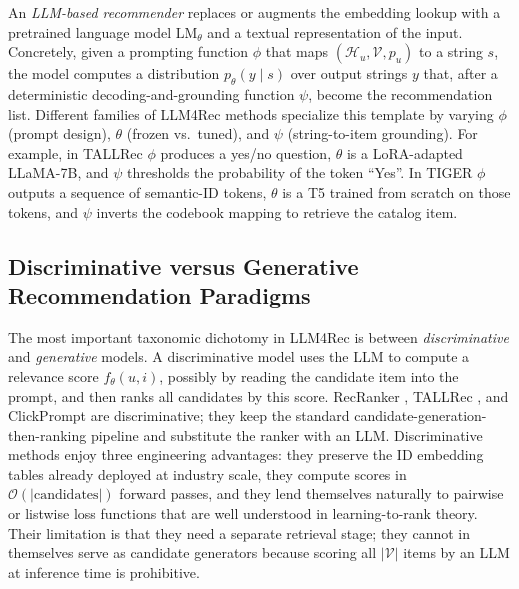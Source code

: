 \documentclass{article}
\begin{document}
An \emph{LLM-based recommender} replaces or augments the embedding lookup with a pretrained language model \(\text{LM}_\theta\) and a textual representation of the input. Concretely, given a prompting function \(\phi\) that maps \((\mathcal{H}_u, \mathcal{V}, p_u)\) to a string \(s\), the model computes a distribution \(p_\theta(y \mid s)\) over output strings \(y\) that, after a deterministic decoding-and-grounding function \(\psi\), become the recommendation list. Different families of LLM4Rec methods specialize this template by varying \(\phi\) (prompt design), \(\theta\) (frozen vs.~tuned), and \(\psi\) (string-to-item grounding). For example, in TALLRec \citep{bao2023arxiv2305004472023} \(\phi\) produces a yes/no question, \(\theta\) is a LoRA-adapted LLaMA-7B, and \(\psi\) thresholds the probability of the token ``Yes''. In TIGER \citep{rajput2023recommendersystems} \(\phi\) outputs a sequence of semantic-ID tokens, \(\theta\) is a T5 trained from scratch on those tokens, and \(\psi\) inverts the codebook mapping to retrieve the catalog item.

\subsection{Discriminative versus Generative Recommendation Paradigms}\label{discriminative-versus-generative-recommendation-paradigms}

The most important taxonomic dichotomy in LLM4Rec is between \emph{discriminative} and \emph{generative} models. A discriminative model uses the LLM to compute a relevance score \(f_\theta(u,i)\), possibly by reading the candidate item into the prompt, and then ranks all candidates by this score. RecRanker \citep{luo2024recrankerinstructi}, TALLRec \citep{bao2023arxiv2305004472023}, and ClickPrompt \citep{lin2023clickpromptctrmode} are discriminative; they keep the standard candidate-generation-then-ranking pipeline and substitute the ranker with an LLM. Discriminative methods enjoy three engineering advantages: they preserve the ID embedding tables already deployed at industry scale, they compute scores in \(\mathcal{O}(|\text{candidates}|)\) forward passes, and they lend themselves naturally to pairwise or listwise loss functions that are well understood in learning-to-rank theory. Their limitation is that they need a separate retrieval stage; they cannot in themselves serve as candidate generators because scoring all \(|\mathcal{V}|\) items by an LLM at inference time is prohibitive.
\end{document}

